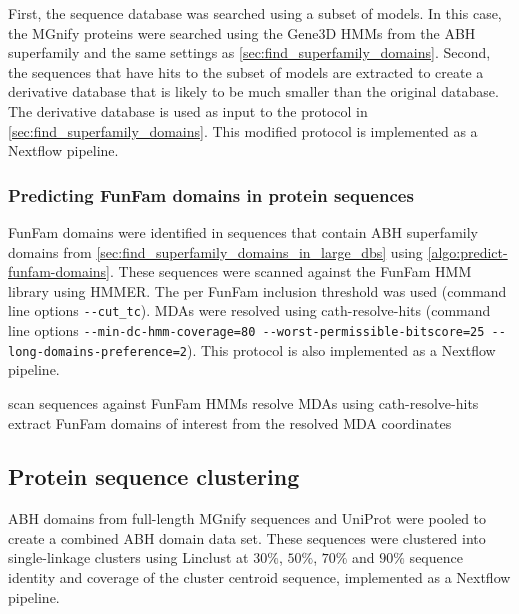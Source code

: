 First, the sequence database was searched using a subset of models. In this case, the MGnify proteins were searched using the Gene$3$D HMMs from the ABH superfamily and the same settings as \ref{sec:find_superfamily_domains}. Second, the sequences that have hits to the subset of models are extracted to create a derivative database that is likely to be much smaller than the original database. The derivative database is used as input to the protocol in \ref{sec:find_superfamily_domains}. This modified protocol is implemented as a Nextflow pipeline.


\subsubsection{Predicting FunFam domains in protein sequences}

FunFam domains were identified in sequences that contain ABH superfamily domains from \ref{sec:find_superfamily_domains_in_large_dbs} using \ref{algo:predict-funfam-domains}. These sequences were scanned against the FunFam HMM library using HMMER. The per FunFam inclusion threshold was used (command line options \texttt{-\/-cut\_tc}). MDAs were resolved using cath-resolve-hits (command line options \texttt{-\/-min-dc-hmm-coverage=80\ -\/-worst-permissible-bitscore=25\ -\/-long-domains-preference=2}). This protocol is also implemented as a Nextflow pipeline.

\begin{algorithm}[hbt!]
    \caption{%
        Predict FunFam domains in protein sequences.
    }
    \label{algo:predict-funfam-domains}
    \begin{algorithmic}[1]
        \Procedure{}{}
        \State scan sequences against FunFam HMMs
        \State resolve MDAs using cath-resolve-hits
        \State extract FunFam domains of interest from the resolved MDA coordinates
        \EndProcedure
    \end{algorithmic}
\end{algorithm}

\subsection{Protein sequence clustering}
\label{sec:clustering}

ABH domains from full-length MGnify sequences and UniProt were pooled to create a combined ABH domain data set. These sequences were clustered into single-linkage clusters using Linclust at $30\%$, $50\%$, $70\%$ and $90\%$ sequence identity and coverage of the cluster centroid sequence, implemented as a Nextflow pipeline.

